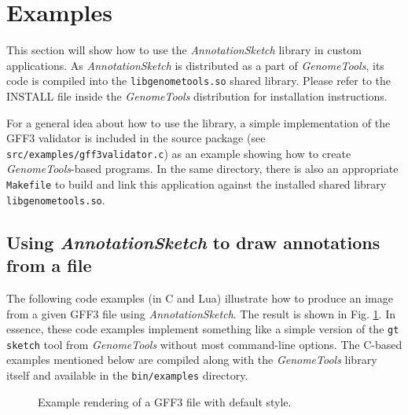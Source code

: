 \documentclass[a4paper]{scrreprt}
\begin{document}
\section{Examples}

This section will show how to use the \emph{AnnotationSketch} library in custom applications. As \emph{AnnotationSketch} is distributed as a part of \emph{GenomeTools}, its code is compiled into the \texttt{lib\-ge\-nome\-tools.so} shared library. Please refer to the INSTALL file inside the \emph{GenomeTools} distribution for installation instructions.

For a general idea about how to use the library, a simple implementation of the GFF3 validator is included in the source package (see \texttt{src/examples/gff3validator.c}) as an example showing how to create \emph{GenomeTools}-based programs. In the same directory, there is also an appropriate \texttt{Makefile} to build and link this application against the installed shared library \texttt{libgenometools.so}.

\subsection{Using \emph{AnnotationSketch} to draw annotations from a file}
The following code examples (in C and Lua) illustrate how to produce an image from a given GFF3 file using \emph{AnnotationSketch}. The result is shown in Fig. \ref{parsed_img}. In essence, these code examples implement something like a simple version of the \texttt{gt sketch} tool from \emph{GenomeTools} without most command-line options. The C-based examples mentioned below are compiled along with the \emph{GenomeTools} library itself and available in the \texttt{bin/examples} directory.

\begin{figure}
\caption{Example rendering of a GFF3 file with default style.}
\label{parsed_img}
\end{figure}
\end{document}
